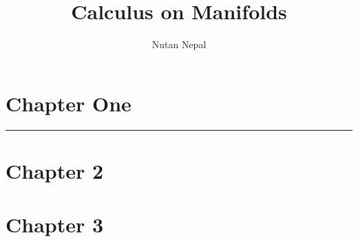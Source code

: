 
\title{Calculus on Manifolds}
\author{Nutan Nepal}



\maketitle
    \section*{Chapter One}
        
        
        
        \begin{questions}
            
            
            
            
            
        \end{questions}
        \hrule
    \section*{Chapter 2}
        \begin{questions}
            
            
            
            
        
            
            
            
            
            
            
            
            
            
            
            
            
            
        \end{questions}
    \section*{Chapter 3}
        \begin{questions}
            
            
            
            
            
            
            
            
        \end{questions}
